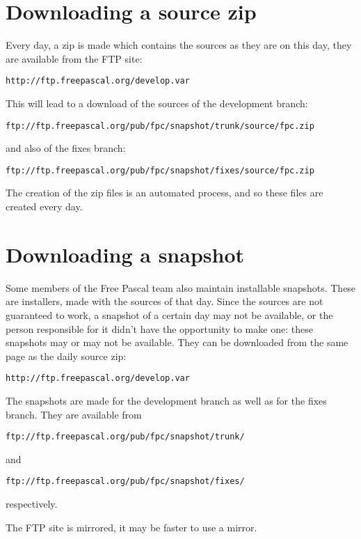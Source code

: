 \section{Downloading a source zip}
Every day, a zip is made which contains the sources as they are on this day,
they are available from the FTP site:
\begin{verbatim}
http://ftp.freepascal.org/develop.var
\end{verbatim}
This will lead to a download of the sources of the development branch:
\begin{verbatim}
ftp://ftp.freepascal.org/pub/fpc/snapshot/trunk/source/fpc.zip
\end{verbatim}
and also of the fixes branch:
\begin{verbatim}
ftp://ftp.freepascal.org/pub/fpc/snapshot/fixes/source/fpc.zip
\end{verbatim}
The creation of the zip files is an automated process, and so these files
are created every day.

\section{Downloading a snapshot}
Some members of the Free Pascal team also maintain installable snapshots.
These are installers, made with the sources of that day. Since the sources
are not guaranteed to work, a snapshot of a certain day may not be
available, or the person responsible for it didn't have the opportunity to
make one: these snapshots may or may not be available. They can be
downloaded from the same page as the daily source zip:
\begin{verbatim}
http://ftp.freepascal.org/develop.var
\end{verbatim}
The snapshots are made for the development branch as well as for the fixes
branch. They are available from
\begin{verbatim}
ftp://ftp.freepascal.org/pub/fpc/snapshot/trunk/
\end{verbatim}
and
\begin{verbatim}
ftp://ftp.freepascal.org/pub/fpc/snapshot/fixes/
\end{verbatim}
respectively.

The FTP site is mirrored, it may be faster to use a mirror.

\printindex[msgnr]

\printindex[msgtxt]


